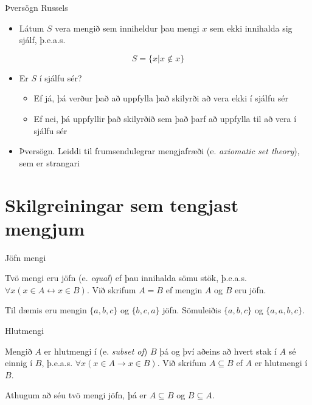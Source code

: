 \documentclass[handout]{beamer}
\begin{document}
\begin{frame}{Þversögn Russels}
\begin{itemize}
 \item Látum $S$ vera mengið sem inniheldur þau mengi $x$ sem ekki innihalda sig sjálf, þ.e.a.s.
\end{itemize}
\[
 S = \{x | x \notin x\}
\]
\begin{itemize}
 \item Er $S$ í sjálfu sér? \pause
 \begin{itemize}
  \item Ef já, þá verður það að uppfylla það skilyrði að vera ekki í sjálfu sér \pause
  \item Ef nei, þá uppfyllir það skilyrðið sem það þarf að uppfylla til að vera í sjálfu sér \pause
 \end{itemize}
 \item Þversögn. Leiddi til frumsendulegrar mengjafræði (e. \emph{axiomatic set theory}), sem er strangari
\end{itemize}
\end{frame}

\section{Skilgreiningar sem tengjast mengjum}

\begin{frame}{Jöfn mengi}
\begin{tcolorbox}[title=Jöfn mengi]
Tvö mengi eru jöfn (e. \emph{equal}) ef þau innihalda sömu stök, þ.e.a.s. $\forall x (x \in A \leftrightarrow x \in B ) $. Við skrifum $A = B$ ef mengin $A$ og $B$ eru jöfn.
\end{tcolorbox}
Til dæmis eru mengin $\{a, b, c\}$ og $\{b, c, a\}$ jöfn. Sömuleiðis $\{a, b, c\}$ og $\{a, a, b, c\}$.
\end{frame}

\begin{frame}{Hlutmengi}
\begin{tcolorbox}[title=Hlutmengi]
Mengið $A$ er hlutmengi í (e. \emph{subset of}) $B$ þá og því aðeins að hvert stak í $A$ sé einnig í $B$, þ.e.a.s. $\forall x (x \in A \to x \in B)$. Við skrifum $A \subseteq B$ ef $A$ er hlutmengi í $B$.
\end{tcolorbox}

Athugum að séu tvö mengi jöfn, þá er $A \subseteq B$ og $B \subseteq A$.
\end{frame}
\end{document}
